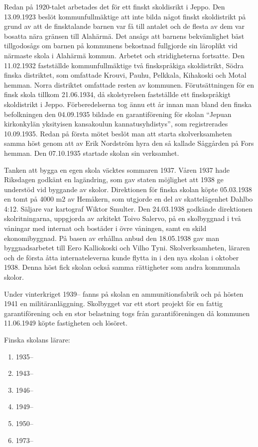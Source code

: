 Redan på 1920-talet arbetades det för ett finskt skoldisrikt i Jeppo.	Den 13.09.1923 beslöt kommunfullmäktige att inte bilda något finskt skoldistrikt på grund av att de finsktalande barnen var få till antalet och de flesta av dem var bosatta nära gränsen till Alahärmä. Det ansågs att barnens bekvämlighet bäst tillgodosågs om barnen på kommunens 	bekostnad fullgjorde sin läroplikt vid närmaste skola i Alahärmä kommun. Arbetet och stridigheterna fortsatte. Den 11.02.1932 fastställde kommunfullmäktige två finskspråkiga skoldistrikt, Södra finska distriktet, som omfattade Krouvi, Pauhu, Pelkkala, Kihakoski och Motal	hemman. Norra distriktet omfattade resten av kommunen.
Förutsättningen för en finsk skola tillkom 21.06.1934, då skolstyrelsen fastställde ett finskspråkigt skoldistrikt i Jeppo. Förberedelserna tog ännu ett år innan man bland den finska befolkningen den 04.09.1935	bildade en garantiförening för skolan ``Jepuan kirkonkylän yksityisen	kansakoulun kannatusyhdistys'', som registrerades 10.09.1935.	Redan på första mötet beslöt man att starta skolverksamheten samma höst genom att av Erik Nordström hyra den så kallade Såggården på	Fors hemman. Den 07.10.1935 startade skolan sin verksamhet.

Tanken att bygga en egen skola väcktes sommaren 1937. Våren 1937 hade Riksdagen godkänt en lagändring, som gav staten möjlighet att 1938 ge understöd vid byggande av skolor. Direktionen för finska skolan köpte	05.03.1938 en tomt på 4000 m2 av Hemåkern, som utgjorde en del av skattelägenhet Dahlbo 4:12. Säljare var kartograf Wiktor Smulter. Den	24.03.1938 godkände direktionen skolritningarna, uppgjorda av arkitekt Toivo Salervo, på en skolbyggnad i två våningar med internat och bostäder i övre våningen, samt en skild ekonomibyggnad. På basen av	erhållna anbud den 18.05.1938 gav man byggnadsarbetet till Eero Kalliokoski och Vilho Tyni. Skolverksamheten, läraren och de första åtta internateleverna kunde flytta in i den nya skolan i oktober 1938. Denna höst fick skolan också samma rättigheter som andra kommunala skolor.

Under vinterkriget 1939-- fanns på skolan en ammunitionsfabrik och	på hösten 1941 en militäranläggning. Skolbygget var ett stort projekt för en fattig garantiförening och en stor belastning togs från garantiföreningen då kommunen 11.06.1949 köpte	fastigheten och lösöret.

Finska skolans lärare:
\begin{enumerate}
  \item 1935--  
  \item 1943--	
  \item 1946--	
  \item 1949--	
  \item 1950--	
  \item 1973--	
\end{enumerate}

